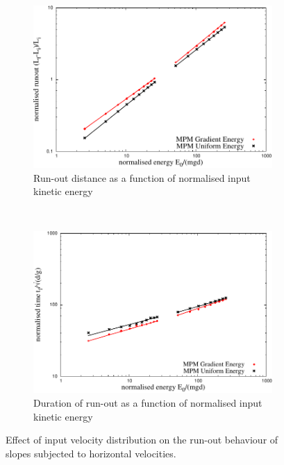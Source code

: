 \begin{figure}[tbph]
\centering
\begin{subfigure}[b]{0.95\textwidth}
\centering
\includegraphics[width=\textwidth]{Runout_Eo_GU}
\caption{Run-out distance as a function of normalised input kinetic energy}
\label{fig:Runout_Eo_GU}
\end{subfigure}
\\
\begin{subfigure}[b]{0.95\textwidth}
\centering
\includegraphics[width=\textwidth]{time_Eo_GU}
\caption{Duration of run-out as a function of normalised input kinetic energy}
\label{fig:time_Eo_GU}
\end{subfigure}
\caption{Effect of input velocity distribution on the run-out behaviour of 
slopes subjected to horizontal velocities.}
\label{fig:GU}
\end{figure}


